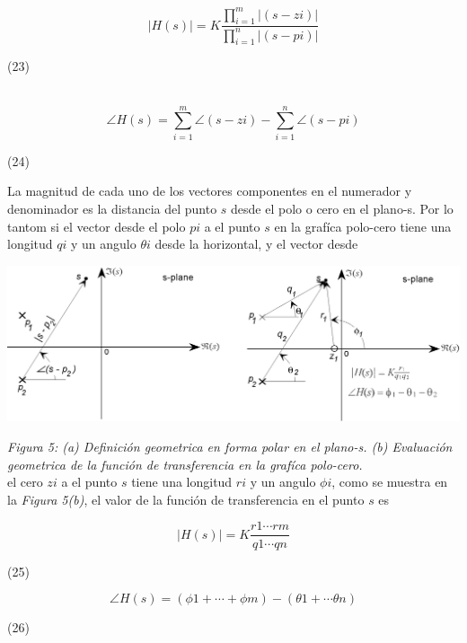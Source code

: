 \documentclass[10pt,a4paper]{article}
\begin{document}
\begin{center}
  \[|H(s)|=K\frac{\prod_{i=1}^m |(s-z{\scriptscriptstyle i})|}{\prod_{i=1}^n |(s-p{\scriptscriptstyle i})|}\]
  \begin{minipage}{0.9\textwidth}
    \begin{flushright}
        (23)
    \end{flushright}
  \end{minipage}
  \\
  \[\angle H(s) = \sum_{i=1}^m \angle(s-z{\scriptscriptstyle i}) - \sum_{i=1}^n \angle(s-p{\scriptscriptstyle i})\]
  \begin{minipage}{0.9\textwidth}
    \begin{flushright}
        (24)
    \end{flushright}
  \end{minipage}
\end{center}
La magnitud de cada uno de los vectores componentes en el numerador y denominador es la distancia del punto $s$ desde el polo o cero en el plano-s. Por lo tantom si el vector desde el polo $p{\scriptscriptstyle i}$ a el punto $s$ en la grafíca polo-cero tiene una longitud $q{\scriptscriptstyle i}$ y un angulo $\theta{\scriptscriptstyle i}$ desde la horizontal, y el vector desde
\clearpage
\begin{center}
  \includegraphics[scale=0.2]{img/figura5a.png}
\end{center}
\textit{Figura 5: (a) Definición geometrica en forma polar en el plano-s. (b) Evaluación geometrica de la función de transferencia en la grafíca polo-cero.}\\
\vspace{0.25cm}el cero $z{\scriptscriptstyle i}$ a el punto $s$ tiene una longitud $r{\scriptscriptstyle i}$ y un angulo $\phi{\scriptscriptstyle i}$, como se muestra en la \textit{Figura 5(b)}, el valor de la función de transferencia en el punto $s$ es
\begin{center}
  \begin{minipage}{0.9\textwidth}
    \[|H(s)|= K \frac{r{\scriptscriptstyle 1}\cdots r{\scriptscriptstyle m}}{q{\scriptscriptstyle 1}\cdots q{\scriptscriptstyle n}}\]
    \begin{flushright}
        (25)\\
    \end{flushright}
  \end{minipage}
  \[\angle H(s)=(\phi{\scriptscriptstyle 1}+\cdots+\phi{\scriptscriptstyle m})-(\theta{\scriptscriptstyle 1}+\cdots\theta{\scriptscriptstyle n})\]
  \begin{minipage}{0.9\textwidth}
    \begin{flushright}
        (26)
    \end{flushright}
  \end{minipage}
\end{center}
\end{document}
